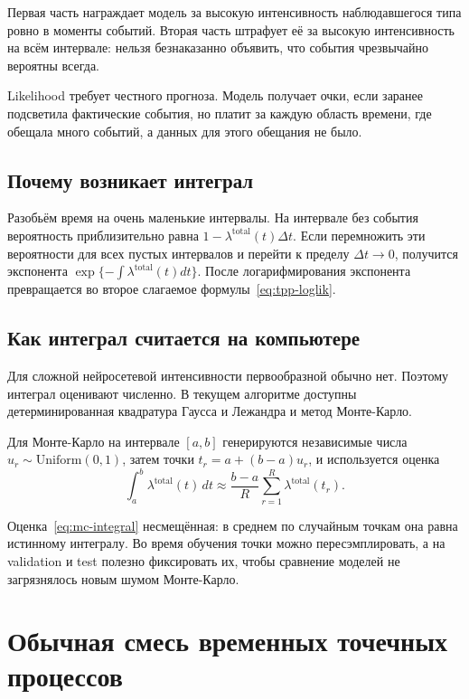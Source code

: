 \documentclass[12pt,a4paper]{article}
\newenvironment{intuitionbox}{\par\medskip\noindent{\color{blue}\bfseries Интуиция. }\ignorespaces}{\par\medskip}
\begin{document}
Первая часть награждает модель за высокую интенсивность наблюдавшегося типа ровно в моменты событий. Вторая часть штрафует её за высокую интенсивность на всём интервале: нельзя безнаказанно объявить, что события чрезвычайно вероятны всегда.

\begin{intuitionbox}
Likelihood требует честного прогноза. Модель получает очки, если заранее подсветила фактические события, но платит за каждую область времени, где обещала много событий, а данных для этого обещания не было.
\end{intuitionbox}

\subsection{Почему возникает интеграл}

Разобьём время на очень маленькие интервалы. На интервале без события вероятность приблизительно равна \(1-\lambda^{\mathrm{total}}(t)\Delta t\). Если перемножить эти вероятности для всех пустых интервалов и перейти к пределу \(\Delta t\to0\), получится экспонента \(\exp\{-\int\lambda^{\mathrm{total}}(t)dt\}\). После логарифмирования экспонента превращается во второе слагаемое формулы~\eqref{eq:tpp-loglik}.

\subsection{Как интеграл считается на компьютере}

Для сложной нейросетевой интенсивности первообразной обычно нет. Поэтому интеграл оценивают численно. В текущем алгоритме доступны детерминированная квадратура Гаусса и Лежандра и метод Монте-Карло.

Для Монте-Карло на интервале \([a,b]\) генерируются независимые числа \(u_r\sim\mathrm{Uniform}(0,1)\), затем точки \(t_r=a+(b-a)u_r\), и используется оценка
\begin{equation}
\int_a^b \lambda^{\mathrm{total}}(t)\,dt\approx \frac{b-a}{R}\sum_{r=1}^{R}\lambda^{\mathrm{total}}(t_r).
\label{eq:mc-integral}
\end{equation}

Оценка~\eqref{eq:mc-integral} несмещённая: в среднем по случайным точкам она равна истинному интегралу. Во время обучения точки можно пересэмплировать, а на validation и test полезно фиксировать их, чтобы сравнение моделей не загрязнялось новым шумом Монте-Карло.

\section{Обычная смесь временных точечных процессов}
\end{document}
